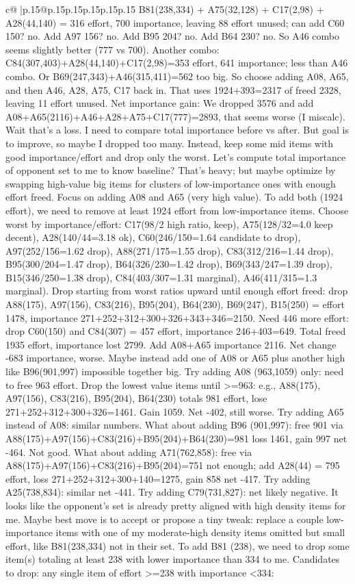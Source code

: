 \documentclass{article}
\begin{document}
{\begin{supertabular}{c@{$\;$}|p{.15\linewidth}@{}p{.15\linewidth}p{.15\linewidth}p{.15\linewidth}p{.15\linewidth}p{.15\linewidth}}
{{{B81(238,334) + A75(32,128) + C17(2,98) + A28(44,140) = 316 effort, 700 importance, leaving 88 effort unused; can add C60 150? no. Add A97 156? no. Add B95 204? no. Add B64 230? no. So A46 combo seems slightly better (777 vs 700). Another combo: C84(307,403)+A28(44,140)+C17(2,98)=353 effort, 641 importance; less than A46 combo. Or B69(247,343)+A46(315,411)=562 too big. So choose adding A08, A65, and then A46, A28, A75, C17 back in. That uses 1924+393=2317 of freed 2328, leaving 11 effort unused. Net importance gain: We dropped 3576 and add A08+A65(2116)+A46+A28+A75+C17(777)=2893, that seems worse (I miscalc). Wait that's a loss. I need to compare total importance before vs after. But goal is to improve, so maybe I dropped too many. Instead, keep some mid items with good importance/effort and drop only the worst. Let's compute total importance of opponent set to me to know baseline? That’s heavy; but maybe optimize by swapping high{-}value big items for clusters of low{-}importance ones with enough effort freed. Focus on adding A08 and A65 (very high value). To add both (1924 effort), we need to remove at least 1924 effort from low{-}importance items. Choose worst by importance/effort: C17(98/2 high ratio, keep), A75(128/32=4.0 keep decent), A28(140/44=3.18 ok), C60(246/150=1.64 candidate to drop), A97(252/156=1.62 drop), A88(271/175=1.55 drop), C83(312/216=1.44 drop), B95(300/204=1.47 drop), B64(326/230=1.42 drop), B69(343/247=1.39 drop), B15(346/250=1.38 drop), C84(403/307=1.31 marginal), A46(411/315=1.3 marginal). Drop starting from worst ratios upward until enough effort freed: drop A88(175), A97(156), C83(216), B95(204), B64(230), B69(247), B15(250) = effort 1478, importance 271+252+312+300+326+343+346=2150. Need 446 more effort: drop C60(150) and C84(307) = 457 effort, importance 246+403=649. Total freed 1935 effort, importance lost 2799. Add A08+A65 importance 2116. Net change {-}683 importance, worse. Maybe instead add one of A08 or A65 plus another high like B96(901,997) impossible together big. Try adding A08 (963,1059) only: need to free 963 effort. Drop the lowest value items until >=963: e.g., A88(175), A97(156), C83(216), B95(204), B64(230) totals 981 effort, lose 271+252+312+300+326=1461. Gain 1059. Net {-}402, still worse. Try adding A65 instead of A08: similar numbers. What about adding B96 (901,997): free 901 via A88(175)+A97(156)+C83(216)+B95(204)+B64(230)=981 loss 1461, gain 997 net {-}464. Not good. What about adding A71(762,858): free via A88(175)+A97(156)+C83(216)+B95(204)=751 not enough; add A28(44) = 795 effort, loss 271+252+312+300+140=1275, gain 858 net {-}417. Try adding A25(738,834): similar net {-}441. Try adding C79(731,827): net likely negative. It looks like the opponent’s set is already pretty aligned with high density items for me. Maybe best move is to accept or propose a tiny tweak: replace a couple low{-}importance items with one of my moderate{-}high density items omitted but small effort, like B81(238,334) not in their set. To add B81 (238), we need to drop some item(s) totaling at least 238 with lower importance than 334 to me. Candidates to drop: any single item of effort >=238 with importance <334: }}}
\end{supertabular}}
\end{document}
